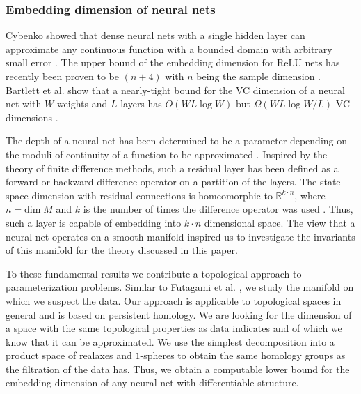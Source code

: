 \documentclass[runningheads,orivec]{llncs}
\begin{document}
\subsubsection*{Embedding dimension of neural nets} Cybenko showed that dense neural nets with a single hidden layer can approximate any continuous function with a bounded domain with arbitrary small error \cite{Cybenko92}. The upper bound of the embedding dimension for ReLU nets has recently been proven to be $(n+4)$ with $n$ being the sample dimension \cite{RaghuPKGS17}. Bartlett et al. show that a nearly-tight bound for the VC dimension of a neural net with $W$ weights and $L$ layers has $O(WL \log W)$ but $\Omega(WL \log W/L)$ VC dimensions \cite{BartlettHLM19}. 

The depth of a neural net has been determined to be a parameter depending on the moduli of continuity of a function to be approximated \cite{LinJ18}. Inspired by the theory of finite difference methods, such a residual layer has been defined as a forward or backward difference operator on a partition of the layers. The state space dimension with residual connections is homeomorphic to $\mathbb{R}^{k \cdot n}$, where $n = \text{dim} \; M$ and $k$ is the number of times the difference operator was used \cite{HauserGJR19}. Thus, such a layer is capable of embedding into $k\cdot n$ dimensional space. The view that a neural net operates on a smooth manifold inspired us to investigate the invariants of this manifold for the theory discussed in this paper. 

To these fundamental results we contribute a topological approach to parameterization problems. Similar to Futagami et al. \cite{FutagamiYS19}, we study the manifold on which we suspect the data. Our approach is applicable to topological spaces in general and is based on persistent homology. We are looking for the dimension of a space with the same topological properties as data indicates and of which we know that it can be approximated. We use the simplest decomposition into a product space of realaxes and $1$-spheres to obtain the same homology groups as the filtration of the data has. Thus, we obtain a computable lower bound for the embedding dimension of any neural net with differentiable structure.


\newpage
\end{document}

